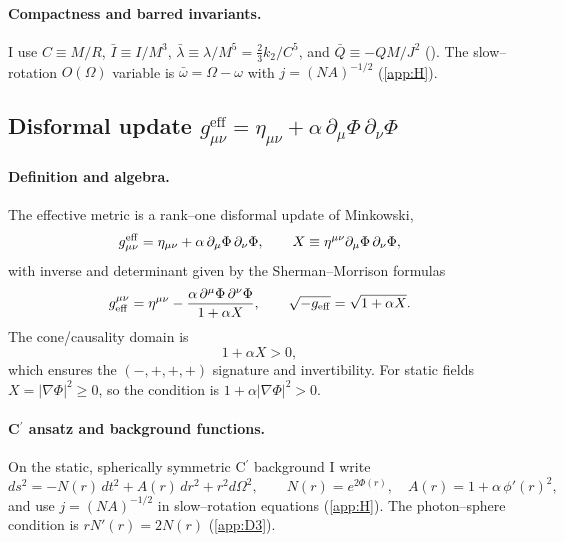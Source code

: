 \documentclass{iopjournal}
\begin{document}
\paragraph{Compactness and barred invariants.}
I use $C\equiv M/R$, $\bar I\equiv I/M^3$, $\bar\lambda\equiv \lambda/M^5=\tfrac{2}{3}k_2/C^5$, and $\bar Q\equiv -QM/J^2$ (). The slow–rotation $O(\Omega)$ variable is $\bar\omega=\Omega-\omega$ with $j=(NA)^{-1/2}$ (\cref{app:H}).

\subsection{\texorpdfstring{Disformal update
$g^{\mathrm{eff}}_{\mu\nu}=\eta_{\mu\nu}+\alpha\,\partial_\mu\Phi\,\partial_\nu\Phi$}{Disformal update: g eff mu nu = eta mu nu + alpha d mu Phi d nu Phi}}\label{app:M4}
\paragraph{Definition and algebra.}
The effective metric is a rank–one disformal update of Minkowski,
\begin{equation}
g^{\rm eff}_{\mu\nu}=\eta_{\mu\nu}+\alpha\,\partial_\mu\Phi\,\partial_\nu\Phi,
\qquad
X\equiv \eta^{\mu\nu}\partial_\mu\Phi\,\partial_\nu\Phi,
\label{eq:M_disformal}
\end{equation}
with inverse and determinant given by the Sherman–Morrison formulas
\begin{equation}
g_{\rm eff}^{\mu\nu}=\eta^{\mu\nu}-\frac{\alpha\,\partial^\mu\Phi\,\partial^\nu\Phi}{1+\alpha X},
\qquad
\sqrt{-g_{\rm eff}}=\sqrt{1+\alpha X}.
\label{eq:M_inverse_det}
\end{equation}
The cone/causality domain is
\begin{equation}
1+\alpha X>0,
\label{eq:M_cone}
\end{equation}
which ensures the $(-,+,+,+)$ signature and invertibility. For static fields $X=|\nabla\Phi|^2\ge0$, so the condition is $1+\alpha|\nabla\Phi|^2>0$.

\paragraph{C$^\prime$ ansatz and background functions.}
On the static, spherically symmetric C$^\prime$ background I write
\[
ds^2=-N(r)\,dt^2+A(r)\,dr^2+r^2 d\Omega^2,\qquad
N(r)=e^{2\Phi(r)},\quad A(r)=1+\alpha\,\phi'(r)^2,
\]
and use $j=(NA)^{-1/2}$ in slow–rotation equations (\cref{app:H}). The photon–sphere condition is $rN'(r)=2N(r)$ (\cref{app:D3}).
\end{document}
